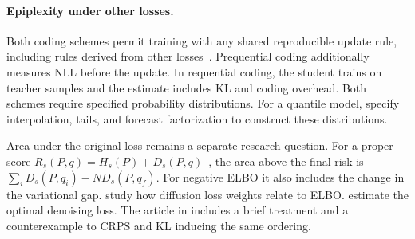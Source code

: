 \documentclass[11pt]{article}
\begin{document}
\paragraph{Epiplexity under other losses.} Both coding schemes permit training
with any shared reproducible update rule, including rules derived from other
losses~\citep{qiu2026}. Prequential coding additionally measures NLL before
the update. In requential coding, the student trains on teacher samples and
the estimate includes KL and coding overhead. Both schemes require specified
probability distributions. For a quantile model, specify interpolation,
tails, and forecast factorization to construct these distributions.

Area under the original loss remains a separate research question.
For a proper score $R_s(P,q)=H_s(P)+D_s(P,q)$~\citep{gneiting2007},
the area above the final risk is $\sum_i D_s(P,q_i)-N D_s(P,q_f)$.
For negative ELBO it also includes the change in the variational gap.
\citet{kingma2023} study how diffusion loss weights relate to ELBO.
\citet{xu2026} estimate the optimal denoising loss. The article in
 includes a brief treatment and a counterexample
to CRPS and KL inducing the same ordering.
\end{document}
